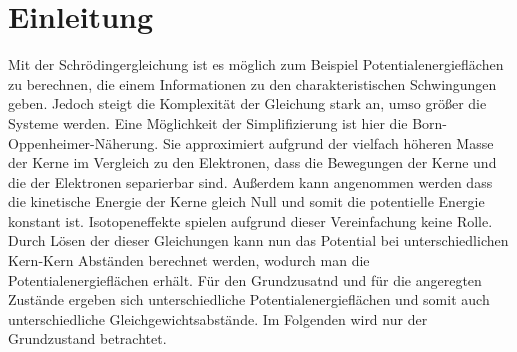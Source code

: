 \documentclass[a4paper]{scrartcl}
\begin{document}
\section{Einleitung}
 Mit der Schrödingergleichung ist es möglich zum Beispiel Potentialenergieflächen zu berechnen, die einem Informationen zu den charakteristischen Schwingungen  geben. Jedoch steigt die Komplexität der Gleichung stark an, umso größer die Systeme werden. Eine Möglichkeit der Simplifizierung ist hier die Born-Oppenheimer-Näherung. Sie approximiert aufgrund der vielfach höheren Masse der Kerne im Vergleich zu den Elektronen, dass die Bewegungen der Kerne und die der Elektronen separierbar sind. Außerdem kann angenommen werden dass die kinetische Energie der Kerne gleich Null und somit die potentielle Energie konstant ist. Isotopeneffekte spielen aufgrund dieser Vereinfachung keine Rolle.
Durch Lösen der dieser Gleichungen kann nun das Potential bei unterschiedlichen Kern-Kern Abständen berechnet werden, wodurch man die Potentialenergieflächen erhält.
Für den Grundzusatnd und für die angeregten Zustände ergeben sich unterschiedliche Potentialenergieflächen und somit auch unterschiedliche Gleichgewichtsabstände. Im Folgenden wird nur der Grundzustand betrachtet.
\end{document}
